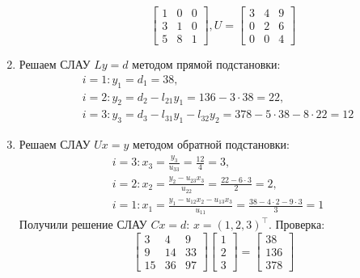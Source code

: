 \documentclass[a4paper, 12pt]{article}
\begin{document}
\begin{enumerate}
\begin{enumerate}
\begin{equation*}
\begin{bmatrix}
					1 & 0 & 0\\
					3 & 1 & 0\\
					5 & 8 & 1
				\end{bmatrix},
				U=
				\begin{bmatrix}
					3 & 4 & 9\\
					0 & 2 & 6\\
					0 & 0 & 4
				\end{bmatrix}
			\end{equation*}
		\end{enumerate}
		\item Решаем СЛАУ $Ly=d$ методом прямой подстановки:
		\begin{equation*}
			\begin{aligned}
				&i=1:y_1=d_1=38,\\
				&i=2:y_2=d_2-l_{21}y_1=136-3\cdot 38=22,\\
				&i=3:y_3=d_3-l_{31}y_1-l_{32}y_2=378-5\cdot 38-8\cdot 22=12
			\end{aligned}
		\end{equation*}
		\item Решаем СЛАУ $Ux=y$ методом обратной подстановки:
		\begin{equation*}
			\begin{aligned}
				&i=3:x_3=\frac{y_3}{u_{33}}=\frac{12}{4}=3,\\
				&i=2:x_2=\frac{y_2-u_{23}x_3}{u_{22}}=\frac{22-6\cdot 3}{2}=2,\\
				&i=1:x_1=\frac{y_1-u_{12}x_2-u_{13}x_3}{u_{11}}=\frac{38-4\cdot 2-9\cdot 3}{3}=1
			\end{aligned}
		\end{equation*}
		Получили решение СЛАУ $Cx=d$: $x=(1,2,3)^\top$. Проверка:
		\begin{equation*}
			\begin{bmatrix}
				3 & 4 & 9 \\
				9 & 14 & 33 \\
				15 & 36 & 97
			\end{bmatrix}
			\begin{bmatrix}
				1 \\ 2 \\ 3
			\end{bmatrix}
			=
			\begin{bmatrix}
				38 \\ 136 \\ 378
			\end{bmatrix}
		\end{equation*}
	\end{enumerate}
\end{document}
